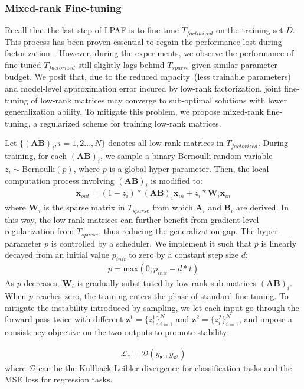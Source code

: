 \subsubsection{Mixed-rank Fine-tuning}
Recall that the last step of LPAF is to fine-tune $T_{factorized}$ on the training set $D$. This process has been proven essential to regain the performance lost during factorization~\cite{svd}. However, during the experiments, we observe the performance of fine-tuned $T_{factorized}$ still slightly lags behind $T_{sparse}$ given similar parameter budget. 
We posit that, due to the reduced capacity~(less trainable parameters) and model-level approximation error incured by low-rank factorization, joint fine-tuning of low-rank matrices may converge to sub-optimal solutions with lower generalization ability. To mitigate this problem, we propose mixed-rank fine-tuning, a regularized scheme for training low-rank matrices.

Let $\{(\bm{A}\bm{B})_i, i=1,2...,N\}$ denotes all low-rank matrices in $T_{factorized}$. During training, for each $(\bm{A}\bm{B})_i$, we sample a binary Bernoulli random variable $z_i\sim \text{Bernoulli}(p)$, where $p$ is a global hyper-parameter. Then, the local computation process involving $(\bm{A}\bm{B})_i$ is modified to:
\begin{align}
	\bm{x}_{out} = (1-z_i)*(\bm{A}\bm{B})_i \bm{x}_{in} + z_i * \bm{W}_i\bm{x}_{in}
\end{align}
where $\bm{W}_i$ is the sparse matrix in $T_{sparse}$ from which $\bm{A}_i$ and $\bm{B}_i$ are derived. In this way, the low-rank matrices can further 
benefit from gradient-level regularization from  $T_{sparse}$, 
thus reducing the generalization gap. The hyper-parameter $p$ is controlled by a scheduler. We implement it such that $p$ is linearly decayed from an initial value $p_{init}$ to zero by a constant step size $d$:
\begin{align}
	p = \text{max}(0, p_{init}-d*t)
\end{align}
As $p$ decreases, $\bm{W}_i$ is gradually substituted by low-rank sub-matrices $(\bm{AB})_i$. When $p$ reaches zero, the training enters the phase of standard fine-tuning. To mitigate the instability introduced by sampling, we let each input go through the forward pass twice with different $\bm{z}^1=\{z_i^1\}_{i=1}^{N}$ and $\bm{z}^2=\{z_i^2\}_{i=1}^{N}$, and impose a consistency objective on the two outputs to promote stability:

\begin{align}
	\mathcal{L}_{c}=\mathcal{D}(y_{\bm{z}^1}, y_{\bm{z}^2})
\end{align}
where $\mathcal{D}$ can be the Kullback-Leibler divergence for classification tasks and the MSE loss for regression tasks.

